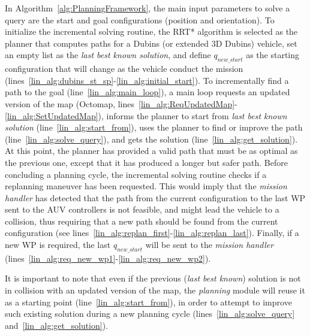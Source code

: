 In Algorithm~\ref{alg:PlanningFramework}, the main input parameters to solve a
query are the start and goal configurations (position and orientation). To
initialize the incremental solving routine, the \ac{RRT*} algorithm is selected
as the planner that computes paths for a Dubins (or extended \ac{3D} Dubins)
vehicle, set an empty list as the \textit{last best known solution}, and define
$q_{new\_start}$ as the starting configuration that will change as the vehicle
conduct the mission
(lines~\ref{lin_alg:dubins_st_sp}-\ref{lin_alg:initial_start}).
To incrementally find a path to the goal (line~\ref{lin_alg:main_loop}), a main
loop requests an updated version of the map (Octomap,
lines~\ref{lin_alg:ReqUpdatedMap}-\ref{lin_alg:SetUpdatedMap}), informs the
planner to start from \textit{last best known solution}
(line~\ref{lin_alg:start_from}), uses the planner to find or improve the path
(line~\ref{lin_alg:solve_query}), and gets the solution
(line~\ref{lin_alg:get_solution}). At this point, the planner has provided a
valid path that must be as optimal as the previous one, except that it has
produced a longer but safer path. Before concluding a planning cycle, the
incremental solving routine checks if a replanning maneuver has been requested.
This would imply that the \textit{mission handler} has detected that the path
from the current configuration to the last \ac{WP} sent to the \ac{AUV}
controllers is not feasible, and might lead the vehicle to a collision, thus
requiring that a new path should be found from the current configuration (see
lines~\ref{lin_alg:replan_first}-\ref{lin_alg:replan_last}).
Finally, if a new \ac{WP} is required, the last $q_{new\_start}$ will be sent to
the \textit{mission handler}
(lines~\ref{lin_alg:req_new_wp1}-\ref{lin_alg:req_new_wp2}).

It is important to note that even if the previous (\textit{last best known})
solution is not in collision with an updated version of the map, the
\textit{planning} module will reuse it as a starting point
(line~\ref{lin_alg:start_from}), in order to attempt to improve such existing
solution during a new planning cycle (lines~\ref{lin_alg:solve_query}
and~\ref{lin_alg:get_solution}).

